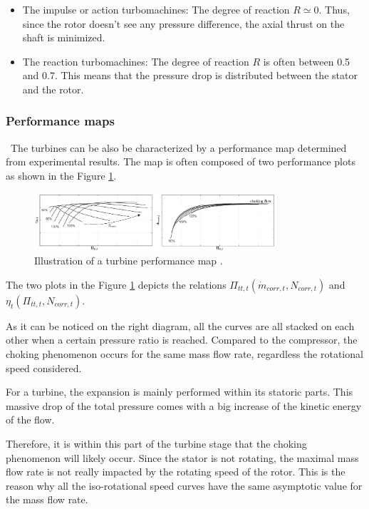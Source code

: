 \begin{itemize}
    \item The impulse or action turbomachines: The degree of reaction \(R\simeq 0\). Thus, since the rotor doesn't see any pressure difference, the axial thrust on the shaft is minimized. 
    \item The reaction turbomachines: The degree of reaction \(R\) is often between 0.5 and 0.7. This means that the pressure drop is distributed between the stator and the rotor.
\end{itemize}

\subsubsection{Performance maps}
\quad\ The turbines can be also be characterized by a performance map determined from experimental results. The map is often composed of two performance plots as shown in the Figure \ref{fig:C4_turbmap}.

\begin{figure}[h]
    \centering
    \includegraphics[width=0.8\textwidth]{Turb_Map.png}
    \caption{Illustration of a turbine performance map \cite{Dixon2013}.}
    \label{fig:C4_turbmap}
\end{figure}

The two plots in the Figure \ref{fig:C4_turbmap} depicts the relations \(\Pi_{tt,t}(\dot{m}_{corr,t},N_{corr,t})\) and \(\eta_t(\Pi_{tt,t},N_{corr,t})\). 

As it can be noticed on the right diagram, all the curves are all stacked on each other when a certain pressure ratio is reached. Compared to the compressor, the choking phenomenon occurs for the same mass flow rate, regardless the rotational speed considered. 

For a turbine, the expansion is mainly performed within its statoric parts. This massive drop of the total pressure comes with a big increase of the kinetic energy of the flow. 

Therefore, it is within this part of the turbine stage that the choking phenomenon will likely occur. Since the stator is not rotating, the maximal mass flow rate is not really impacted by the rotating speed of the rotor. This is the reason why all the iso-rotational speed curves have the same asymptotic value for the mass flow rate.

